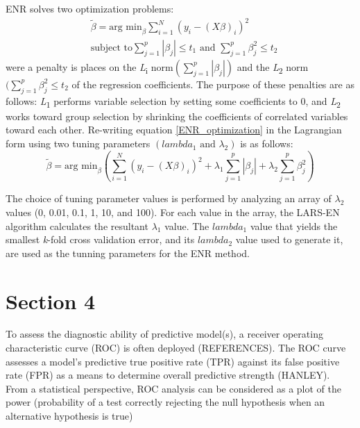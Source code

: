 ENR solves two optimization problems:
\begin{equation} \label{ENR_optimization}
\begin{aligned}
&\tilde{\beta} = \text{arg min}_\beta \sum_{i=1}^{N} (y_i - (X\beta)_i)^2 \\
&\text{subject to} \sum_{j=1}^{p} |\beta_j | \le t_1 \text{ and } \sum_{j=1}^{p} \beta_j^2 \le t_2
\end{aligned}
\end{equation}
were a penalty is places on the \textit{L}\textsubscript{i} norm$(\sum_{j=1}^{p} |\beta_j|)$ and the \textit{L}\textsubscript{2} norm $(\sum_{j=1}^{p}\beta_{j}^{2} \le t_2$ of the regression coefficients. The purpose of these penalties are as follows: \textit{L}\textsubscript{1} performs variable selection by setting some coefficients to 0, and \textit{L}\textsubscript{2} works toward group selection by shrinking the coefficients of correlated variables toward each other. Re-writing equation \ref{ENR_optimization} in the Lagrangian form using two tuning parameters $(lambda_1 \text{ and } \lambda_2)$ is as follows:
\begin{equation} \label{ENR_lagrangian}
\tilde{\beta} = \text{arg min}_\beta \left(\sum_{i=1}^{N} (y_i - (X\beta)_i)^2 + \lambda_1 \sum_{j=1}^{p} |\beta_j| + \lambda_2 \sum_{j=1}^{p} \beta_{j}^{2}\right)
\end{equation}

The choice of tuning parameter values is performed by analyzing an array of $\lambda_2$ values (0, 0.01, 0.1, 1, 10, and 100). For each value in the array, the LARS-EN algorithm calculates the resultant $\lambda_1$ value. The $lambda_1$ value that yields the smallest \textit{k}-fold cross validation error, and its $lambda_2$ value used to generate it, are used as the tunning parameters for the ENR method.


\section{Section 4}\label{Reciever Operator Characterisitics}
To assess the diagnostic ability of predictive model(s), a receiver operating characteristic curve (ROC) is often deployed (REFERENCES). The ROC curve assesses a model's predictive true positive rate (TPR) against its false positive rate (FPR) as a means to determine overall predictive strength (HANLEY). From a statistical perspective, ROC analysis can be considered as a plot of the power (probability of a test correctly rejecting the null hypothesis when an alternative hypothesis is true) 

